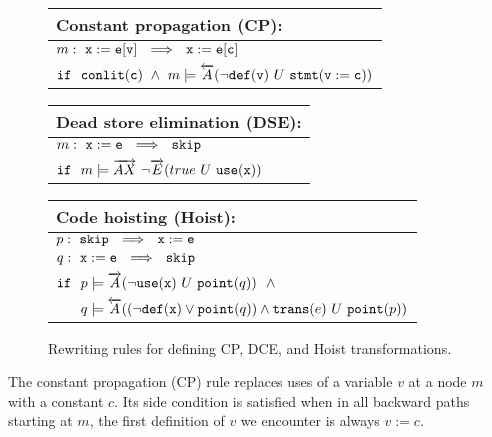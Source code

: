 \begin{figure}[ht]
\begin{center}
\begin{small}

\begin{tabularx}{0.8\textwidth}{|X|}\hline
{\bf Constant propagation} (CP):\\\hline
$m: ~ {\tt x:=e[v]} ~~ \Longrightarrow ~~ {\tt x:=e[c]}$ \\
${\tt if} ~~ \text{${\tt conlit}$}(\text{${\tt c}$}) ~ \wedge ~ m \models \overleftarrow{A}(\neg\text{${\tt def}$}(\text{${\tt v}$}) ~ U ~ \text{${\tt stmt}$}({\tt v:=c}))$ \\\hline
\end{tabularx}

\vspace{2mm}

\begin{tabularx}{0.8\textwidth}{|X|}\hline
{\bf Dead store elimination} (DSE):\\\hline
$m: ~ {\tt x:=e} ~~ \Longrightarrow ~~ {\tt skip}$ \\
${\tt if} ~~ m \models \overrightarrow{AX} ~ \neg\overrightarrow{E}(true ~ U ~ \text{${\tt use}$}(\text{${\tt x}$}))$ \\\hline
\end{tabularx}

\vspace{2mm}

\begin{tabularx}{0.8\textwidth}{|X|}\hline
{\bf Code hoisting} (Hoist):\\\hline
$p: ~ {\tt skip} ~~ \Longrightarrow ~~ {\tt x:=e}$ \\
$q: ~ {\tt x:=e} ~~ \Longrightarrow ~~ {\tt skip}$ \\
${\tt if} ~~ p \models \overrightarrow{A}(\neg\text{${\tt use}$}(\text{${\tt x}$}) ~ U ~ \text{${\tt point}$}(q)) ~~ \wedge$ \\
$\hphantom{\texttt{if}} ~~ q \models \overleftarrow{A}((\neg\wdef(\wx)\vee\wpoint(q))\wedge \wtrans(e) ~ U ~ \wpoint(p))$ \\\hline
\end{tabularx}

\vspace{-2mm}

\end{small}
\end{center}
\caption{\label{fig:sample-trans} Rewriting rules for defining CP, DCE, and Hoist transformations.}
\end{figure}

\noindent The constant propagation (CP) rule replaces uses of a variable $v$ at a node $m$ with a constant $c$. Its side condition is satisfied when in all backward paths starting at $m$, the first definition of $v$ we encounter is always $v:=c$.


